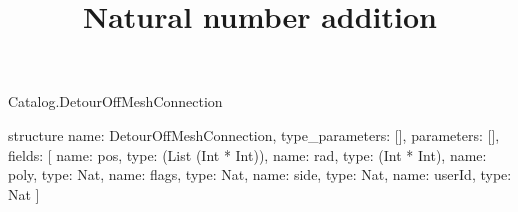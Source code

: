 \begin{lexlean}{Catalog.DetourOffMeshConnection}
\title{Natural number addition}
\begin{semanticmodule}
structure{
  name: DetourOffMeshConnection,
  type_parameters: [],
  parameters: [],
  fields: [
    {name: pos, type: (List (Int * Int))},
    {name: rad, type: (Int * Int)},
    {name: poly, type: Nat},
    {name: flags, type: Nat},
    {name: side, type: Nat},
    {name: userId, type: Nat}
  ]
}
\end{semanticmodule}
\end{lexlean}
